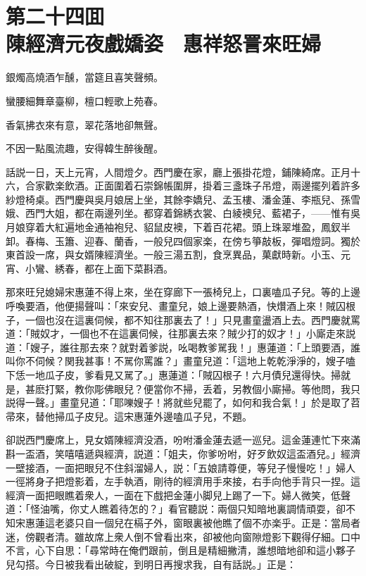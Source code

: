 
\chapter*{第二十四囬　\\陳經濟元夜戲嬌姿　惠祥怒詈來旺婦}


\begin{myquote}
銀燭高燒酒乍醺，當筵且喜笑聲頻。

蠻腰細舞章臺柳，檀口輕歌上苑春。

香氣拂衣來有意，翠花落地卻無聲。

不因一點風流趣，安得韓生醉後醒。
\end{myquote}

話説一日，天上元宵，人間燈夕。西門慶在家，廳上張掛花燈，鋪陳綺席。正月十六，合家歡楽飲酒。正面圍着石崇錦帳圍屏，掛着三盞珠子吊燈，兩邊擺列着許多紗燈椅桌。西門慶與吳月娘居上坐，其餘李嬌兒、孟玉樓、潘金蓮、李瓶兒、孫雪娥、西門大姐，都在兩邊列坐。都穿着錦綉衣裳、白綾襖兒、藍裙子，——惟有吳月娘穿着大紅遍地金通袖袍兒、貂鼠皮襖，下着百花裙。頭上珠翠堆盈，鳳釵半卸。春梅、玉簫、迎春、蘭香，一般兒四個家楽，在傍ち箏敲板，彈唱燈詞。獨於東首設一席，與女婿陳經濟坐。一般三湯五割，食烹異品，菓獻時新。小玉、元宵、小鸞、綉春，都在上面下菜斟酒。

那來旺兒媳婦宋惠蓮不得上來，坐在穿廊下一張椅兒上，口裏嗑瓜子兒。等的上邊呼喚要酒，他便揚聲叫：「來安兒、畫童兒，娘上邊要熱酒，快𤓎酒上來！賊囚根子，一個也沒在這裏伺候，都不知往那裏去了！」只見畫童盪酒上去。西門慶就罵道：「賊奴才，一個也不在這裏伺候，往那裏去來？賊少打的奴才！」小廝走來説道：「嫂子，誰往那去來？就對着爹説，吆喝教爹駡我！」惠蓮道：「上頭要酒，誰叫你不伺候？関我甚事！不駡你罵誰？」畫童兒道：「這地上乾乾淨淨的，嫂子嗑下恁一地瓜子皮，爹看見又駡了。」惠蓮道：「賊囚根子！六月債兒還得快。掃就是，甚麽打緊，教你彫佛眼兒？便當你不掃，丢着，另教個小廝掃。等他問，我只説得一聲。」畫童兒道：「耶嚛嫂子！將就些兒罷了，如何和我合氣！」於是取了苕帚來，替他掃瓜子皮兒。這宋惠蓮外邊嗑瓜子兒，不題。

卻説西門慶席上，見女婿陳經濟没酒，吩咐潘金蓮去遞一巡兒。這金蓮連忙下來滿斟一盃酒，笑嘻嘻遞與經濟，説道：「姐夫，你爹吩咐，好歹飲奴這盃酒兒。」經濟一壁接酒，一面把眼兒不住斜溜婦人，説：「五娘請尊便，等兒子慢慢吃！」婦人一徑將身子把燈影着，左手執酒，剛待的經濟用手來接，右手向他手背只一捏。這經濟一面把眼瞧着衆人，一面在下戲把金蓮小脚兒上踢了一下。婦人微笑，低聲道：「怪油嘴，你丈人瞧着待怎的？」看官聽説：兩個只知暗地裏調情頑耍，卻不知宋惠蓮這老婆只自一個兒在槅子外，窗眼裏被他瞧了個不亦楽乎。正是：當局者迷，傍觀者清。雖故席上衆人倒不曾看出來，卻被他向窗隙燈影下觀得仔細。口中不言，心下自思：「尋常時在俺們跟前，倒且是精細撇清，誰想暗地卻和這小夥子兒勾搭。今日被我看出破綻，到明日再搜求我，自有話説。」正是：

